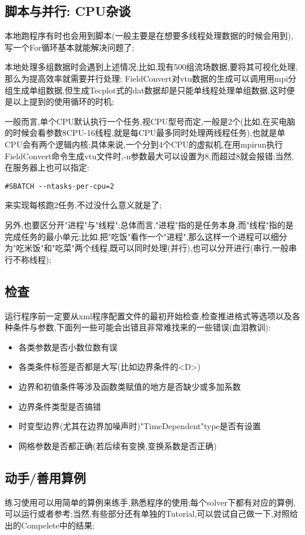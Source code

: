 \subsection{脚本与并行: CPU杂谈}
本地跑程序有时也会用到脚本(一般主要是在想要多线程处理数据的时候会用到),写一个For循环基本就能解决问题了;\par
本地处理多组数据时会遇到上述情况;比如,现有500组流场数据,要将其可视化处理,那么为提高效率就需要并行处理; FieldConvert对vtu数据的生成可以调用用mpi分组生成单组数据,但生成Tecplot式的dat数据却是只能单线程处理单组数据,这时便是以上提到的使用循环的时机;\par
一般而言,单个CPU默认执行一个任务,视CPU型号而定,一般是2个(比如,在买电脑的时候会看参数8CPU-16线程,就是每CPU最多同时处理两线程任务),也就是单CPU会有两个逻辑内核;具体来说,一个分到4个CPU的虚拟机,在用mpirun执行FieldConvert命令生成vtu文件时,-n参数最大可以设置为8,而超过8就会报错;当然,在服务器上也可以指定:
\begin{lstlisting}[frame=single]
#SBATCH --ntasks-per-cpu=2
\end{lstlisting}
\noindent
来实现每核跑2任务,不过没什么意义就是了;\par
另外,也要区分开"进程"与"线程";总体而言,"进程"指的是任务本身,而"线程"指的是完成任务的最小单元;比如,把"吃饭"看作一个"进程",那么这样一个进程可以细分为"吃米饭"和"吃菜"两个线程,既可以同时处理(并行),也可以分开进行(串行,一般串行不称线程);

\subsection{检查}
运行程序前一定要从xml程序配置文件的最初开始检查,检查推进格式等选项以及各种条件与参数,下面列一些可能会出错且非常难找来的一些错误(血泪教训):\par

\begin{itemize}
	\item{各类参数是否小数位数有误}
	\item{各类条件标签是否都是大写(比如边界条件的<D>)}
	\item{边界和初值条件等涉及函数类赋值的地方是否缺少或多加系数}
	\item{边界条件类型是否搞错}
	\item{时变型边界(尤其在边界加噪声时)"TimeDependent"type是否有设置}
	\item{网格参数是否都正确(若后续有变换,变换系数是否正确)}
\end{itemize}

\subsection{动手/善用算例}
练习使用可以用简单的算例来练手,熟悉程序的使用;每个solver下都有对应的算例,可以运行或者参考;当然,有些部分还有单独的Tutorial,可以尝试自己做一下,对照给出的Compelete中的结果;
